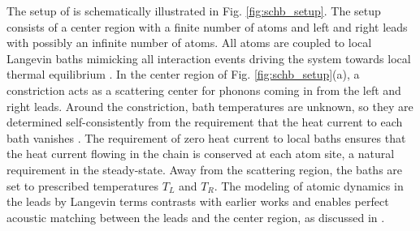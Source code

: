 The setup of  is schematically illustrated in Fig. \ref{fig:schb_setup}. The setup consists of a center region with a finite number of atoms and left and right leads with possibly an infinite number of atoms. All atoms are coupled to local Langevin baths mimicking all interaction events driving the system towards local thermal equilibrium \cite{bolsterli70}. In the center region of Fig. \ref{fig:schb_setup}(a), a constriction acts as a scattering center for phonons coming in from the left and right leads. Around the constriction, bath temperatures are unknown, so they are determined self-consistently from the requirement that the heat current to each bath vanishes \cite{bolsterli70}. The requirement of zero heat current to local baths ensures that the heat current flowing in the chain is conserved at each atom site, a natural requirement in the steady-state. Away from the scattering region, the baths are set to prescribed temperatures $T_L$ and $T_R$. The modeling of atomic dynamics in the leads by Langevin terms contrasts with earlier works \cite{dhar06} and enables perfect acoustic matching between the leads and the center region, as discussed in .  %



